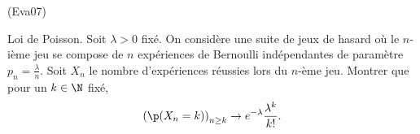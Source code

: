\begin{tiny}(Eva07)\end{tiny} Loi de Poisson.\newline
Soit $\lambda>0$ fixé. On considère une suite de jeux de hasard où le $n$-ième jeu se compose de $n$ expériences de Bernoulli indépendantes de paramètre $p_n = \frac{\lambda}{n}$. Soit $X_n$ le nombre d'expériences réussies lors du $n$-ème jeu.\newline
Montrer que pour un $k\in \N$ fixé,
\begin{displaymath}
 \left( \p(X_n=k)\right) _{n\geq k} \rightarrow e^{-\lambda} \frac{\lambda^k}{k!}.
\end{displaymath}
 
